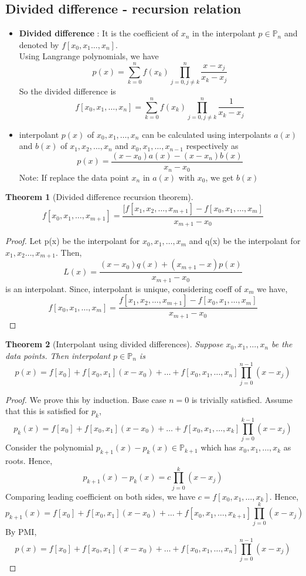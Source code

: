 \documentclass{article}
\newtheorem*{theorem}{Theorem}
\begin{document}
\subsection{Divided difference - recursion relation}
	\begin{itemize}
		\item \textbf{Divided difference} : It is the coefficient of $x_n$ in the interpolant $p \in \mathbb{P}_n$ and denoted by $f[x_0,x_1\hdots,x_n]$.\\
		Using Langrange polynomials, we have
		\[p(x)=\sum_{k=0}^n f(x_k) \prod_{j=0, j\neq k}^n \frac{x-x_j}{x_k-x_j}\]
		So the divided difference is
		\[f[x_0,x_1,\hdots,x_n]=\sum_{k=0}^n f(x_k) \prod_{j=0, j\neq k}^n \frac{1}{x_k-x_j}\]

		\item interpolant $p(x)$ of  $x_0,x_1,\hdots,x_n$ can be calculated using interpolants $a(x)$ and $b(x)$ of $x_1,x_2,\hdots,x_n$ and $x_0,x_1,\hdots,x_{n-1}$ respectively as 
			\[p(x)=\frac{(x-x_0)a(x)-(x-x_n)b(x)}{x_n-x_0}\]
		Note: If replace the data point $x_n$ in $a(x)$ with $x_0$, we get $b(x)$
	\end{itemize}

	\begin{theorem}[Divided difference recursion theorem]
		\[f[x_0,x_1,\hdots,x_{m+1}] = \frac{[f[x_1, x_2,\hdots,x_{m+1}] - f[x_0,x_1,\hdots,x_{m}]}{x_{m+1}-x_0}\]
	\end{theorem}
	\begin{proof}
		Let p(x) be the interpolant for $x_0,x_1,\hdots,x_m$ and q(x) be the interpolant for $x_1,x_2\hdots,x_{m+1}$. Then,
		\[L(x)= \frac{(x-x_0)q(x)+(x_{m+1}-x)p(x)}{x_{m+1}-x_0}\] is an interpolant.
		Since, interpolant is unique, considering coeff of $x_{m}$ we have,
		\[f[x_0,x_1,\hdots, x_m]=  \frac{f[x_1, x_2,\hdots,x_{m+1}] - f[x_0,x_1,\hdots,x_{m}]}{x_{m+1}-x_0}\]
	\end{proof}

	\begin{theorem}[Interpolant using divided differences]
		Suppose $x_0,x_1,\hdots,x_n$ be the data points. Then interpolant $p \in \mathbb{P}_n$ is
		\[p(x)=f[x_0]+f[x_0,x_1](x-x_0)+ \hdots +f[x_0,x_1,\hdots,x_n] \prod_{j=0}^{n-1}(x-x_j)\]
	\end{theorem}

	\begin{proof}
		We prove this by induction. Base case $n=0$ is trivially satisfied.
		Assume that this is satisfied for $p_{k}$,
		\[p_k(x)=f[x_0]+f[x_0,x_1](x-x_0)+ \hdots +f[x_0,x_1,\hdots,x_k] \prod_{j=0}^{k-1}(x-x_j)\]
		Consider the polynomial $p_{k+1}(x)-p_k(x) \in \mathbb{P}_{k+1}$ which has $x_0,x_1,\hdots,x_k$ as roots. Hence,
		\[p_{k+1}(x)-p_k(x) = c\prod_{j=0}^k(x-x_j)\]
		Comparing leading coefficient on both sides, we have $c=f[x_0,x_1,\hdots,x_k]$. Hence,
		\[p_{k+1}(x)=f[x_0]+f[x_0,x_1](x-x_0)+ \hdots +f[x_0,x_1,\hdots,x_{k+1}] \prod_{j=0}^{k}(x-x_j)\]
		By PMI,
		\[p(x)=f[x_0]+f[x_0,x_1](x-x_0)+ \hdots +f[x_0,x_1,\hdots,x_n] \prod_{j=0}^{n-1}(x-x_j)\]


	\end{proof}
\end{document}
